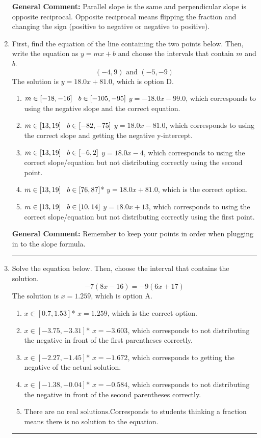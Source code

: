 \documentclass{extbook}[14pt]
\newcommand{\litem}[1]{\item#1\hspace*{-1cm}\rule{\textwidth}{0.4pt}}
\begin{document}
\begin{enumerate}
{\textbf{General Comment:} Parallel slope is the same and perpendicular slope is opposite reciprocal. Opposite reciprocal means flipping the fraction and changing the sign (positive to negative or negative to positive).
}
\litem{
First, find the equation of the line containing the two points below. Then, write the equation as $ y=mx+b $ and choose the intervals that contain $m$ and $b$.
\[ (-4, 9) \text{ and } (-5, -9) \]
The solution is \( y = 18.0x + 81.0 \), which is option D.\begin{enumerate}[label=\Alph*.]
\item \( m \in [-18, -16] \hspace*{3mm} b \in [-105, -95] \) $y = -18.0x -99.0$, which corresponds to using the negative slope and the correct equation.
\item \( m \in [13, 19] \hspace*{3mm} b \in [-82, -75] \) $y = 18.0x -81.0$, which corresponds to using the correct slope and getting the negative y-intercept.
\item \( m \in [13, 19] \hspace*{3mm} b \in [-6, 2] \) $y = 18.0x -4$, which corresponds to using the correct slope/equation but not distributing correctly using the second point.
\item \( m \in [13, 19] \hspace*{3mm} b \in [76, 87] \)* $y = 18.0x + 81.0$, which is the correct option.
\item \( m \in [13, 19] \hspace*{3mm} b \in [10, 14] \) $y = 18.0x + 13$, which corresponds to using the correct slope/equation but not distributing correctly using the first point.
\end{enumerate}

\textbf{General Comment:} Remember to keep your points in order when plugging in to the slope formula.
}
\litem{
Solve the equation below. Then, choose the interval that contains the solution.
\[ -7(8x -16) = -9(6x + 17) \]
The solution is \( x = 1.259 \), which is option A.\begin{enumerate}[label=\Alph*.]
\item \( x \in [0.7, 1.53] \)* $x = 1.259$, which is the correct option.
\item \( x \in [-3.75, -3.31] \)* $x = -3.603$, which corresponds to not distributing the negative in front of the first parentheses correctly.
\item \( x \in [-2.27, -1.45] \)* $x = -1.672$, which corresponds to getting the negative of the actual solution.
\item \( x \in [-1.38, -0.04] \)* $x = -0.584$, which corresponds to not distributing the negative in front of the second parentheses correctly.
\item \( \text{There are no real solutions.} \)Corresponds to students thinking a fraction means there is no solution to the equation.
\end{enumerate}

}
\end{enumerate}
\end{document}
